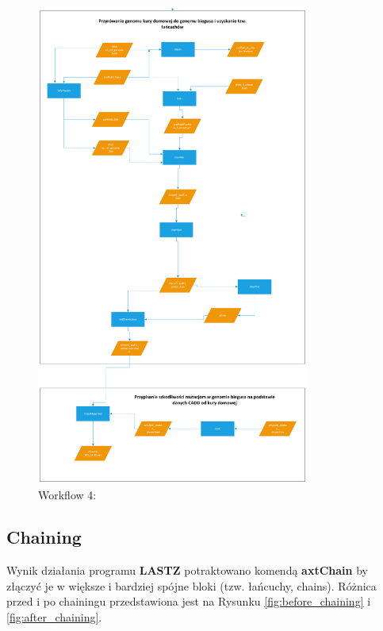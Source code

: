 \documentclass[a4paper, 12pt]{article}
\begin{document}
\begin{figure}[H]
    \centering
    \includegraphics[width=0.8\textwidth]{img/workflow4.png}
    \caption{Workflow 4: }
    \label{fig:workflow4}
\end{figure}

\subsection{Chaining}
Wynik działania programu \textbf{LASTZ} potraktowano komendą \textbf{axtChain} by złączyć je w większe i bardziej spójne bloki (tzw. 
łańcuchy, chains). Różnica przed i po chainingu przedstawiona jest na Rysunku \ref{fig:before_chaining} i \ref{fig:after_chaining}.
\end{document}
